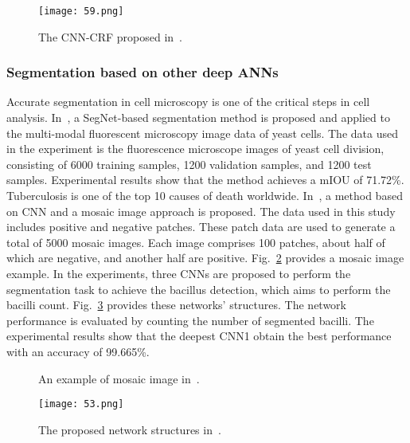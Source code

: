 \begin{figure}[htbp!]
\centering
\texttt{[image: 59.png]}
\caption{The CNN-CRF proposed in~\cite{Zhang-2020-AMCF}.}
\label{fig59}
\end{figure}

\subsubsection{Segmentation based on other deep ANNs}


Accurate segmentation in cell microscopy is one of the critical steps in cell analysis. In~\cite{Aydin-2017-CBTC}, a SegNet-based segmentation method is proposed and applied to the multi-modal fluorescent microscopy image data of yeast cells. The data used in the experiment is the fluorescence microscope images of yeast cell division, consisting of 6000 training samples, 1200 validation samples, and 1200 test samples. Experimental results show that the method achieves a mIOU of 71.72\%. Tuberculosis is one of the top 10 causes of death worldwide. In~\cite{Serrao-2020-ABDL}, a method based on CNN and a mosaic image approach is proposed. The data used in this study includes positive and negative patches. These patch data are used to generate a total of 5000 mosaic images. Each image comprises 100 patches, about half of which are negative, and another half are positive. Fig.~\ref{fig51} provides a mosaic image example. In the experiments, three CNNs are proposed to perform the segmentation task to achieve the bacillus detection, which aims to perform the bacilli count. Fig.~\ref{fig53} provides these networks' structures. The network performance is evaluated by counting the number of segmented bacilli. The experimental results show that the deepest CNN1 obtain the best performance with an accuracy of 99.665\%.


\begin{figure}[htbp!]
\centering  
{}
\caption{An example of mosaic image in~\cite{Serrao-2020-ABDL}.}
\label{fig51}
\end{figure}

\begin{figure}[htbp!]
\centering
\texttt{[image: 53.png]}
\caption{The proposed network structures in~\cite{Serrao-2020-ABDL}.}
\label{fig53}
\end{figure}

